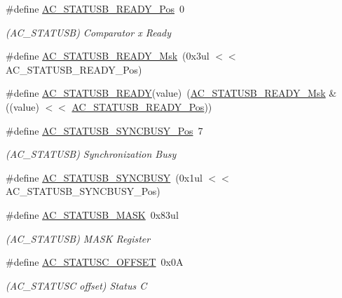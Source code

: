 \begin{DoxyCompactItemize}
\item 
\#define \mbox{\hyperlink{group___s_a_m_d21___a_c_ga97f22583e9717be73effe4c24a88d435}{A\+C\+\_\+\+S\+T\+A\+T\+U\+S\+B\+\_\+\+R\+E\+A\+D\+Y\+\_\+\+Pos}}~0
\begin{DoxyCompactList}\small\item\em (A\+C\+\_\+\+S\+T\+A\+T\+U\+SB) Comparator x Ready \end{DoxyCompactList}\item 
\#define \mbox{\hyperlink{group___s_a_m_d21___a_c_ga5d87d9f9e07305caa36db61678ce7ad3}{A\+C\+\_\+\+S\+T\+A\+T\+U\+S\+B\+\_\+\+R\+E\+A\+D\+Y\+\_\+\+Msk}}~(0x3ul $<$$<$ A\+C\+\_\+\+S\+T\+A\+T\+U\+S\+B\+\_\+\+R\+E\+A\+D\+Y\+\_\+\+Pos)
\item 
\#define \mbox{\hyperlink{group___s_a_m_d21___a_c_ga210c9ac99e879b97b08baeeae2386c1e}{A\+C\+\_\+\+S\+T\+A\+T\+U\+S\+B\+\_\+\+R\+E\+A\+DY}}(value)~(\mbox{\hyperlink{group___s_a_m_d21___a_c_ga5d87d9f9e07305caa36db61678ce7ad3}{A\+C\+\_\+\+S\+T\+A\+T\+U\+S\+B\+\_\+\+R\+E\+A\+D\+Y\+\_\+\+Msk}} \& ((value) $<$$<$ \mbox{\hyperlink{group___s_a_m_d21___a_c_ga97f22583e9717be73effe4c24a88d435}{A\+C\+\_\+\+S\+T\+A\+T\+U\+S\+B\+\_\+\+R\+E\+A\+D\+Y\+\_\+\+Pos}}))
\item 
\#define \mbox{\hyperlink{group___s_a_m_d21___a_c_ga06a09b757028d4a6012fe4f6bc92d6ef}{A\+C\+\_\+\+S\+T\+A\+T\+U\+S\+B\+\_\+\+S\+Y\+N\+C\+B\+U\+S\+Y\+\_\+\+Pos}}~7
\begin{DoxyCompactList}\small\item\em (A\+C\+\_\+\+S\+T\+A\+T\+U\+SB) Synchronization Busy \end{DoxyCompactList}\item 
\#define \mbox{\hyperlink{group___s_a_m_d21___a_c_gad6efb90db0564a8a3f84798d9b84af22}{A\+C\+\_\+\+S\+T\+A\+T\+U\+S\+B\+\_\+\+S\+Y\+N\+C\+B\+U\+SY}}~(0x1ul $<$$<$ A\+C\+\_\+\+S\+T\+A\+T\+U\+S\+B\+\_\+\+S\+Y\+N\+C\+B\+U\+S\+Y\+\_\+\+Pos)
\item 
\#define \mbox{\hyperlink{group___s_a_m_d21___a_c_ga4e32c46f408ba606dc303acdd3e4e546}{A\+C\+\_\+\+S\+T\+A\+T\+U\+S\+B\+\_\+\+M\+A\+SK}}~0x83ul
\begin{DoxyCompactList}\small\item\em (A\+C\+\_\+\+S\+T\+A\+T\+U\+SB) M\+A\+SK Register \end{DoxyCompactList}\item 
\#define \mbox{\hyperlink{group___s_a_m_d21___a_c_ga23e88286f4ab6d019bd1eafa83864b14}{A\+C\+\_\+\+S\+T\+A\+T\+U\+S\+C\+\_\+\+O\+F\+F\+S\+ET}}~0x0A
\begin{DoxyCompactList}\small\item\em (A\+C\+\_\+\+S\+T\+A\+T\+U\+SC offset) Status C \end{DoxyCompactList}\item 
$$
\end{DoxyCompactItemize}
